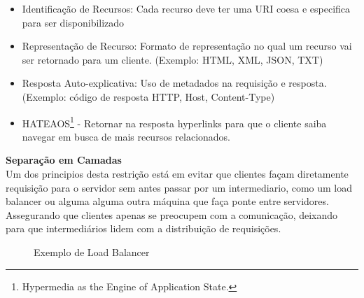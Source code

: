 \begin{itemize}[noitemsep]
\item Identificação de Recursos: Cada recurso deve ter uma URI coesa e especifica para ser disponibilizado
\item Representação de Recurso: Formato de representação no qual um recurso vai ser retornado para um cliente. (Exemplo: HTML, XML, JSON, TXT)
\item Resposta Auto-explicativa: Uso de metadados na requisição e resposta. (Exemplo: código de resposta HTTP, Host, Content-Type)
\item HATEAOS\footnote{
  Hypermedia as the Engine of Application State.
} - Retornar na resposta hyperlinks para que o cliente saiba navegar em busca de mais recursos relacionados.
\end{itemize}

\textbf{Separação em Camadas} \\

Um dos principios desta restrição está em evitar que clientes façam diretamente requisição para o servidor sem antes passar por um intermediario, como um load balancer ou alguma alguma outra máquina que faça ponte entre servidores. Assegurando que clientes apenas se preocupem com a comunicação, deixando para que intermediários lidem com a distribuição de requisições. \cite{Fielding2000}

\begin{figure}[H]
  \centering
  \caption{Exemplo de Load Balancer}
\end{figure}

